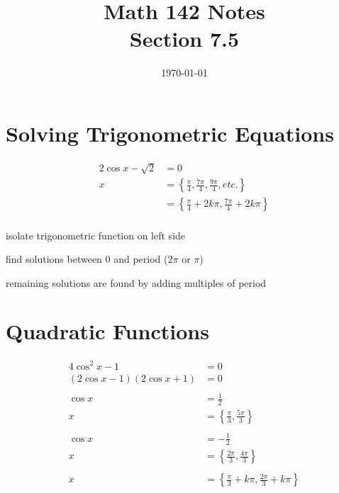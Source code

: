 \documentclass{exam}
\title{Math 142 Notes \\ Section 7.5}
\date{\today}
\begin{document}
  \maketitle
  \tableofcontents

  \section{Solving Trigonometric Equations}
  \begin{align*}
    2 \cos x - \sqrt{2} & = 0 \\
    x                   & = \left\{ \frac{\pi}{4}, \frac{7\pi}{4}, \frac{9\pi}{4}, etc. \right\} \\
                        & = \left\{ \frac{\pi}{4} + 2k \pi, \frac{7\pi}{4} + 2k \pi \right\} \\
  \end{align*}

  \begin{itemize*}
    \item isolate trigonometric function on left side
    \item find solutions between 0 and period ($2 \pi$ or $\pi$)
    \item remaining solutions are found by adding multiples of period 
  \end{itemize*}

  \section{Quadratic Functions}
  \begin{align*}
    4 \cos^2 x - 1               & = 0 \\
    (2 \cos x - 1)(2 \cos x + 1) & = 0 \\
    \\
    \cos x & = \frac{1}{2} \\
    x      & = \left\{ \frac{\pi}{3}, \frac{5 \pi}{3} \right\} \\
    \\
    \cos x & = - \frac{1}{2} \\
    x      & = \left\{ \frac{2 \pi}{3}, \frac{4 \pi}{3} \right\} \\
    \\
    x      & = \boxed{ \left\{ \frac{\pi}{3} + k \pi, \frac{2 \pi}{3} + k \pi \right\} } \\
  \end{align*}
\end{document}
